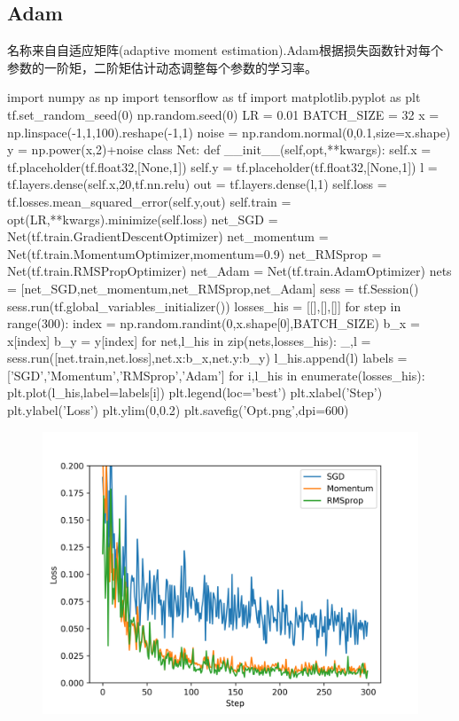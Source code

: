 \subsection{Adam}
名称来自自适应矩阵(adaptive moment estimation).Adam根据损失函数针对每个参数的一阶矩，二阶矩估计动态调整每个参数的学习率。
\begin{python}
import numpy as np
import tensorflow as tf
import matplotlib.pyplot as plt
tf.set_random_seed(0)
np.random.seed(0)
LR = 0.01
BATCH_SIZE = 32
x = np.linspace(-1,1,100).reshape(-1,1)
noise = np.random.normal(0,0.1,size=x.shape)
y = np.power(x,2)+noise
class Net:
    def __init__(self,opt,**kwargs):
        self.x = tf.placeholder(tf.float32,[None,1])
        self.y = tf.placeholder(tf.float32,[None,1])
        l = tf.layers.dense(self.x,20,tf.nn.relu)
        out = tf.layers.dense(l,1)
        self.loss = tf.losses.mean_squared_error(self.y,out)
        self.train = opt(LR,**kwargs).minimize(self.loss)
net_SGD = Net(tf.train.GradientDescentOptimizer)
net_momentum = Net(tf.train.MomentumOptimizer,momentum=0.9)
net_RMSprop = Net(tf.train.RMSPropOptimizer)
net_Adam = Net(tf.train.AdamOptimizer)
nets = [net_SGD,net_momentum,net_RMSprop,net_Adam]
sess = tf.Session()
sess.run(tf.global_variables_initializer())
losses_his = [[],[],[]]
for step in range(300):
    index = np.random.randint(0,x.shape[0],BATCH_SIZE)
    b_x = x[index]
    b_y = y[index]
    for net,l_his in zip(nets,losses_his):
        _,l = sess.run([net.train,net.loss],{net.x:b_x,net.y:b_y})
        l_his.append(l)
labels = ['SGD','Momentum','RMSprop','Adam']
for i,l_his in enumerate(losses_his):
    plt.plot(l_his,label=labels[i])
plt.legend(loc='best')
plt.xlabel('Step')
plt.ylabel('Loss')
plt.ylim(0,0.2)
plt.savefig('Opt.png',dpi=600)
\end{python}
\begin{figure}[H]
	\centering
	\includegraphics[scale=0.6]{./pic/chapter1/Opt.png}
\end{figure}
